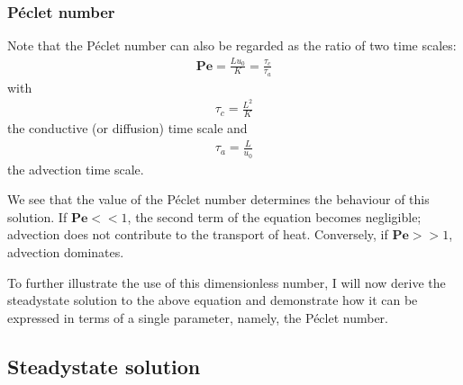 \documentclass[letterpaper,10pt,english]{jupyterBook}
\begin{document}
\subsubsection{Péclet number}
\label{\detokenize{diffusion-advection:peclet-number}}
\sphinxAtStartPar
Note that the Péclet number can also be regarded as the ratio of two time scales:
\begin{equation*}
\begin{split}\mathbf{Pe}=\frac{Lu_0}{K}=\frac{\tau_c}{\tau_a}\end{split}
\end{equation*}
\sphinxAtStartPar
with
\begin{equation*}
\begin{split}\tau_c=\frac{L^2}{K}\end{split}
\end{equation*}
\sphinxAtStartPar
the conductive (or diffusion) time scale and
\begin{equation*}
\begin{split}\tau_a=\frac{L}{u_0}\end{split}
\end{equation*}
\sphinxAtStartPar
the advection time scale.

\sphinxAtStartPar
We see that the value of the Péclet number determines the behaviour of this solution. If \(\mathbf{Pe}<<1\), the second term of the equation becomes negligible; advection does not contribute to the transport of heat. Conversely, if \(\mathbf{Pe}>>1\), advection dominates.

\sphinxAtStartPar
To further illustrate the use of this dimensionless number, I will now derive the steady\sphinxhyphen{}state solution to the above equation and demonstrate how it can be expressed in terms of a single parameter, namely, the Péclet number.

\sphinxstepscope


\subsection{Steady\sphinxhyphen{}state solution}
\label{\detokenize{solution:steady-state-solution}}\label{\detokenize{solution::doc}}
\end{document}
